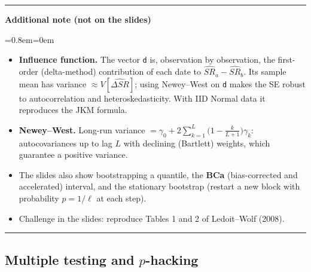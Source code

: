 \documentclass[11pt,a4paper]{report}
\newenvironment{notebox}[1]
  {\par\medskip\Needspace{6\baselineskip}\noindent\rule{\linewidth}{0.4pt}\par\nopagebreak
   \noindent\textbf{#1}\par\nopagebreak
   \begin{list}{}{\leftmargin=0.8em\rightmargin=0em\topsep=2pt}\item[]}
  {\end{list}\nopagebreak\noindent\rule{\linewidth}{0.4pt}\par\medskip}
\newenvironment{addnote}{\begin{notebox}{Additional note (not on the slides)}}{\end{notebox}}
\begin{document}
\begin{addnote}
\begin{itemize}
  \item \textbf{Influence function.} The vector \texttt{d} is, observation by
    observation, the first-order (delta-method) contribution of each date to
    $\widehat{SR}_a-\widehat{SR}_b$. Its sample mean has variance
    $\approx V[\widehat{\Delta SR}]$; using Newey--West on \texttt{d} makes the SE
    robust to autocorrelation and heteroskedasticity. With IID Normal data it
    reproduces the JKM formula.
  \item \textbf{Newey--West.} Long-run variance $=\gamma_0+2\sum_{k=1}^{L}
    \big(1-\frac{k}{L+1}\big)\gamma_k$: autocovariances up to lag $L$ with
    declining (Bartlett) weights, which guarantee a positive variance.
  \item The slides also show bootstrapping a quantile, the \textbf{BCa}
    (bias-corrected and accelerated) interval, and the stationary bootstrap
    (restart a new block with probability $p=1/\ell$ at each step).
  \item Challenge in the slides: reproduce Tables 1 and 2 of Ledoit--Wolf (2008).
\end{itemize}
\end{addnote}

\subsection{Multiple testing and $p$-hacking}
\end{document}
